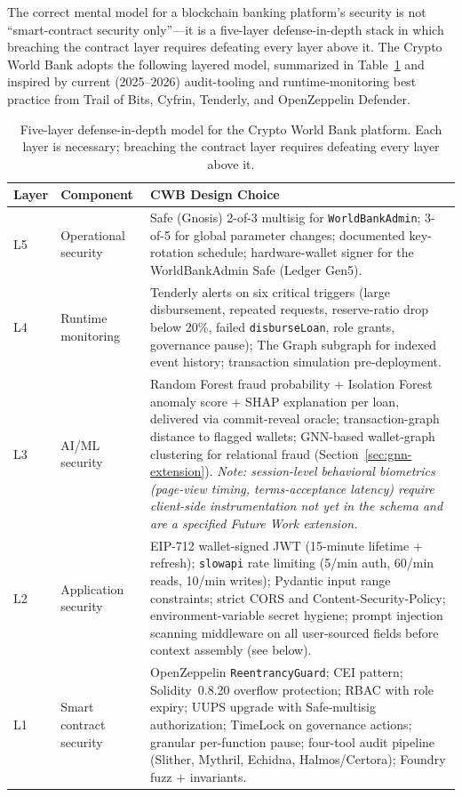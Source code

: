 \documentclass[12pt,a4paper]{report}
\newcommand{\tableheadcolor}{\rowcolor{TableHeadBg}}
\begin{document}
The correct mental model for a blockchain banking platform's security is not ``smart-contract security only''---it is a five-layer defense-in-depth stack in which breaching the contract layer requires defeating every layer above it. The Crypto World Bank adopts the following layered model, summarized in Table~\ref{tab:defense-layers} and inspired by current (2025--2026) audit-tooling and runtime-monitoring best practice from Trail of Bits, Cyfrin, Tenderly, and OpenZeppelin Defender.

\begin{table}[H]
\centering
\caption[Five-layer defense-in-depth model]{Five-layer defense-in-depth model for the Crypto World Bank platform. Each layer is necessary; breaching the contract layer requires defeating every layer above it.}
\label{tab:defense-layers}
\begin{tabular}{p{1.4cm}p{4.0cm}p{8.5cm}}
\toprule
\tableheadcolor
\textbf{Layer} & \textbf{Component} & \textbf{CWB Design Choice} \\
\midrule
L5 & Operational security & Safe (Gnosis) 2-of-3 multisig for \texttt{WorldBankAdmin}; 3-of-5 for global parameter changes; documented key-rotation schedule; hardware-wallet signer for the WorldBankAdmin Safe (Ledger Gen5). \\
L4 & Runtime monitoring & Tenderly alerts on six critical triggers (large disbursement, repeated requests, reserve-ratio drop below 20\%, failed \texttt{disburseLoan}, role grants, governance pause); The Graph subgraph for indexed event history; transaction simulation pre-deployment. \\
L3 & AI/ML security & Random Forest fraud probability + Isolation Forest anomaly score + SHAP explanation per loan, delivered via commit-reveal oracle; transaction-graph distance to flagged wallets; GNN-based wallet-graph clustering for relational fraud (Section~\ref{sec:gnn-extension}). \textit{Note: session-level behavioral biometrics (page-view timing, terms-acceptance latency) require client-side instrumentation not yet in the schema and are a specified Future Work extension.} \\
L2 & Application security & EIP-712 wallet-signed JWT (15-minute lifetime + refresh); \texttt{slowapi} rate limiting (5/min auth, 60/min reads, 10/min writes); Pydantic input range constraints; strict CORS and Content-Security-Policy; environment-variable secret hygiene; prompt injection scanning middleware on all user-sourced fields before context assembly (see below). \\
L1 & Smart contract security & OpenZeppelin \texttt{ReentrancyGuard}; CEI pattern; Solidity~0.8.20 overflow protection; RBAC with role expiry; UUPS upgrade with Safe-multisig authorization; TimeLock on governance actions; granular per-function pause; four-tool audit pipeline (Slither, Mythril, Echidna, Halmos/Certora); Foundry fuzz + invariants. \\
\bottomrule
\end{tabular}
\end{table}
\end{document}
